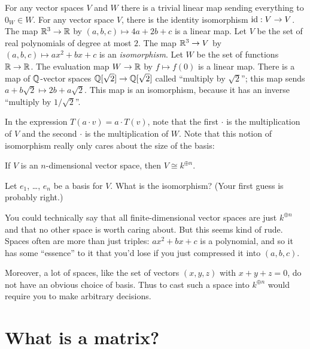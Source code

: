 \begin{example}
	\listhack
	\begin{enumerate}[(a)]
		\ii For any vector spaces $V$ and $W$ there is a trivial linear map sending everything to $0_W \in W$.
		\ii For any vector space $V$, there is the identity isomorphism $\mathrm{id} : V \to V$.
		\ii The map $\mathbb R^3 \to \mathbb R$ by $(a,b,c) \mapsto 4a+2b+c$ is a linear map.
		\ii Let $V$ be the set of real polynomials of degree at most $2$.
		The map $\mathbb R^3 \to V$ by $(a,b,c) \mapsto ax^2+bx+c$ is an \emph{isomorphism}.
		\ii Let $W$ be the set of functions $\mathbb R \to \mathbb R$.
		The evaluation map $W \to \mathbb R$ by $f \mapsto f(0)$ is a linear map.
		\ii There is a map of $\mathbb Q$-vector spaces $\mathbb Q[\sqrt2] \to \mathbb Q[\sqrt2]$
		called ``multiply by $\sqrt2$''; this map sends $a+b\sqrt2 \mapsto 2b + a\sqrt2$.
		This map is an isomorphism, because it has an inverse ``multiply by $1/\sqrt2$''.
	\end{enumerate}
\end{example}

In the expression $T(a \cdot v) = a \cdot T(v)$, note that the first $\cdot$ is the multiplication of $V$ and the second $\cdot$ is the multiplication of $W$.
Note that this notion of isomorphism really only cares about the size of the basis:
\begin{proposition}
	If $V$ is an $n$-dimensional vector space, then
	$V \cong k^{\oplus n}$.
\end{proposition}
\begin{ques}
	Let $e_1$, \dots, $e_n$ be a basis for $V$.
	What is the isomorphism?
	(Your first guess is probably right.)
\end{ques}
\begin{remark}
	You could technically say that all finite-dimensional vector
	spaces are just $k^{\oplus n}$ and that no other space is worth
	caring about.
	But this seems kind of rude.
	Spaces often are more than just triples: $ax^2+bx+c$ is a polynomial,
	and so it has some ``essence'' to it that you'd lose if you
	just compressed it into $(a,b,c)$.

	Moreover, a lot of spaces, like the set of vectors $(x,y,z)$ with $x+y+z=0$,
	do not have an obvious choice of basis.
	Thus to cast such a space into $k^{\oplus n}$
	would require you to make arbitrary decisions.
\label{rem:vector_spaces_have_essence}
\end{remark}

\section{What is a matrix?}

